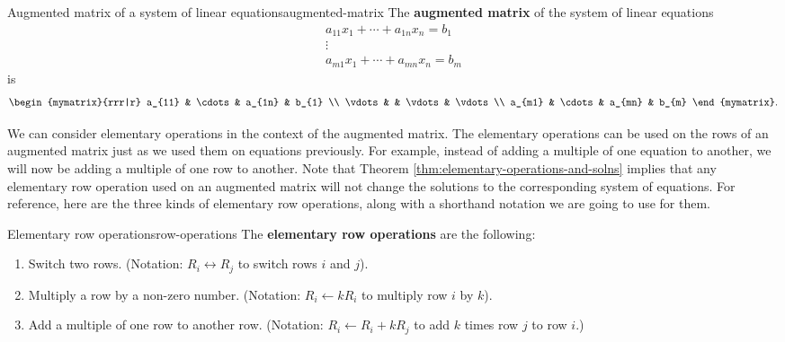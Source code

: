 \begin{definition}{Augmented matrix of a system of linear equations}{augmented-matrix}
  The \textbf{augmented matrix}
  of the system of linear equations
  \begin{equation*}
    \begin{array}{c}
      a_{11}x_{1}+\cdots +a_{1n}x_{n}=b_{1} \\
      \vdots \\
      a_{m1}x_{1}+\cdots +a_{mn}x_{n}=b_{m}
    \end{array}
  \end{equation*}
  is
  \begin{equation*}
    \begin{mymatrix}{rrr|r}
      a_{11} & \cdots & a_{1n} &  b_{1} \\
      \vdots &  & \vdots &  \vdots \\
      a_{m1} & \cdots & a_{mn} &  b_{m}
    \end{mymatrix}.
  \end{equation*}
\end{definition}

We can consider elementary operations in the context of the augmented
matrix. The elementary operations can be used on the rows of an
augmented matrix just as we used them on equations previously. For
example, instead of adding a multiple of one equation to another, we
will now be adding a multiple of one row to another. Note that Theorem
\ref{thm:elementary-operations-and-solns} implies that any elementary row
operation used on an augmented matrix will not change the solutions
to the corresponding system of equations. For reference, here are the
three kinds of elementary row operations, along with a shorthand
notation we are going to use for them.

\begin{definition}{Elementary row operations}{row-operations}
  The \textbf{elementary row operations} are the following:
  

  \begin{enumerate}
  \item Switch two rows. (Notation: $R_i\leftrightarrow R_j$ to switch
    rows $i$ and $j$).
    
  \item Multiply a row by a non-zero number.  (Notation: $R_i\leftarrow
    kR_i$ to multiply row $i$ by $k$).    
    
  \item Add a multiple of one row to another row. (Notation:
    $R_i\leftarrow R_i+kR_j$ to add $k$ times row $j$ to row $i$.)
  \end{enumerate}
\end{definition}

